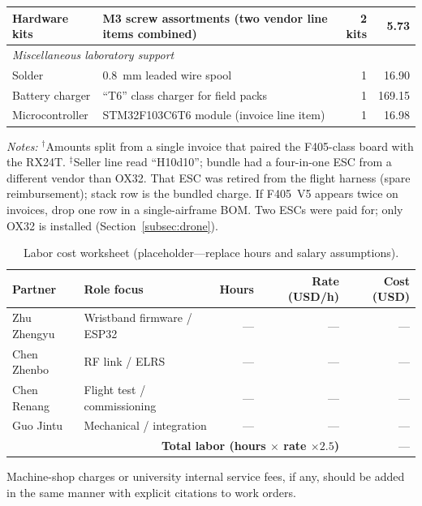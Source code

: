 \begin{table}[htb!]
\begin{tabularx}{\linewidth}{l X r r}
        Hardware kits   & M3 screw assortments (two vendor line items combined) & 2 kits & 5.73 \\
        \hline
        \multicolumn{4}{l}{\emph{Miscellaneous laboratory support}} \\
        Solder          & 0.8~mm leaded wire spool & 1 & 16.90 \\
        Battery charger & ``T6'' class charger for field packs & 1 & 169.15 \\
        Microcontroller & STM32F103C6T6 module (invoice line item) & 1 & 16.98 \\
        \hline
    \end{tabularx}
\end{table}
\noindent\footnotesize
\textit{Notes:}
$^{\dagger}$Amounts split from a single invoice that paired the F405-class board with the RX24T.
$^{\ddagger}$Seller line read ``H10d10''; bundle had a four-in-one ESC from a different vendor than OX32.
That ESC was retired from the flight harness (spare reimbursement); stack row is the bundled charge.
If F405~V5 appears twice on invoices, drop one row in a single-airframe BOM\@.
Two ESCs were paid for; only OX32 is installed (Section~\ref{subsec:drone}).

\begin{table}[htb!]
    \centering
    \caption{Labor cost worksheet (placeholder---replace hours and salary assumptions).}
    \label{tab:labor}
    \begin{tabularx}{\linewidth}{l X r r r}
        \hline
        \textbf{Partner} & \textbf{Role focus} &
            \textbf{Hours} & \textbf{Rate (USD/h)} & \textbf{Cost (USD)} \\
        \hline
        Zhu Zhengyu  & Wristband firmware / ESP32 & --- & --- & --- \\
        Chen Zhenbo  & RF link / ELRS             & --- & --- & --- \\
        Chen Renang  & Flight test / commissioning & --- & --- & --- \\
        Guo Jintu    & Mechanical / integration   & --- & --- & --- \\
        \hline
        \multicolumn{4}{r}{\textbf{Total labor (hours $\times$ rate $\times 2.5$)}} &
            --- \\
        \hline
    \end{tabularx}
\end{table}

Machine-shop charges or university internal service fees, if any, should be added in the same manner
with explicit citations to work orders.
